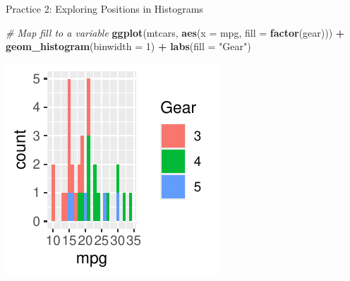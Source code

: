 \documentclass[
  ignorenonframetext,
]{beamer}
\newenvironment{Shaded}{\begin{snugshade}}{\end{snugshade}}
\newcommand{\AttributeTok}[1]{\textcolor[rgb]{0.13,0.29,0.53}{#1}}
\newcommand{\CommentTok}[1]{\textcolor[rgb]{0.56,0.35,0.01}{\textit{#1}}}
\newcommand{\DecValTok}[1]{\textcolor[rgb]{0.00,0.00,0.81}{#1}}
\newcommand{\FunctionTok}[1]{\textcolor[rgb]{0.13,0.29,0.53}{\textbf{#1}}}
\newcommand{\NormalTok}[1]{#1}
\newcommand{\SpecialCharTok}[1]{\textcolor[rgb]{0.81,0.36,0.00}{\textbf{#1}}}
\newcommand{\StringTok}[1]{\textcolor[rgb]{0.31,0.60,0.02}{#1}}
\begin{document}
\begin{frame}[fragile]{Practice 2: Exploring Positions in Histograms}
\label{practice-2-exploring-positions-in-histograms-1}

\begin{Shaded}
\begin{Highlighting}[]
\CommentTok{\# Map fill to a variable}
\FunctionTok{ggplot}\NormalTok{(mtcars, }\FunctionTok{aes}\NormalTok{(}\AttributeTok{x =}\NormalTok{ mpg, }\AttributeTok{fill =} \FunctionTok{factor}\NormalTok{(gear))) }\SpecialCharTok{+} \FunctionTok{geom\_histogram}\NormalTok{(}\AttributeTok{binwidth =} \DecValTok{1}\NormalTok{) }\SpecialCharTok{+}
    \FunctionTok{labs}\NormalTok{(}\AttributeTok{fill =} \StringTok{"Gear"}\NormalTok{)}
\end{Highlighting}
\end{Shaded}

\begin{center}\includegraphics[width=0.5\linewidth]{Figs/unnamed-chunk-41-1} \end{center}
\end{frame}
\end{document}
